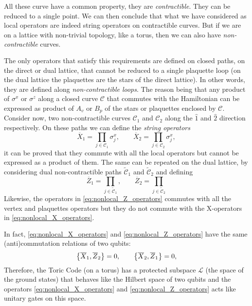 All these curve have a common property, they are \emph{contractible}.
They can be reduced to a single point.
We can then conclude that what we have considered as local operators are indeed string operators on contractible curves.
But if we are on a lattice with non-trivial topology, like a torus, then we can also have \emph{non-contractible} curves.





The only operators that satisfy this requirements are defined on closed paths, on the direct or dual lattice, that cannot be reduced to a single plaquette loop (on the dual lattice the plaquettes are the stars of the direct lattice).
In other words, they are defined along \emph{non-contractible loops}.
The reason being that any product of $\sigma^x$ or $\sigma^z$ along a closed curve $\mathcal{C}$ that commutes with the Hamiltonian can be expressed as product of $A_v$ or $B_p$ of the stars or plaquettes enclosed by $\mathcal{C}$.
Consider now, two non-contractible curves $\mathcal{C}_{1}$ and $\mathcal{C}_{2}$ along the $\hat{1}$ and $\hat{2}$ direction respectively.
On these paths we can define the \emph{string operators}
\begin{equation}
    \overline{X}_1 = \prod_{j \in \mathcal{C}_1}  \sigma^x_j, \qquad
    \overline{X}_2 = \prod_{j \in \mathcal{C}_2}  \sigma^x_j,
    \label{eq:nonlocal_X_operators}
\end{equation}
it can be proved that they commute with all the local operators but cannot be expressed as a product of them.
The same can be repeated on the dual lattice, by considering dual non-contractible paths $\tilde{\mathcal{C}}_1$ and $\tilde{\mathcal{C}}_2$ and defining
\begin{equation}
    \overline{Z}_1 = \prod_{j \in \mathcal{\tilde{C}}_1}, \qquad
    \overline{Z}_2 = \prod_{j \in \mathcal{\tilde{C}}_2}
    \label{eq:nonlocal_Z_operators}
\end{equation}
Likewise, the operators in \eqref{eq:nonlocal_Z_operators} commutes with all the vertex and plaquettes operators but they do not commute with the X-operators in \eqref{eq:nonlocal_X_operators}.

In fact, \eqref{eq:nonlocal_X_operators} and \eqref{eq:nonlocal_Z_operators} have the same (anti)commutation relations of two qubits:
\begin{equation}
    \qty{ \overline{X}_1, \overline{Z}_2 } = 0, \qquad
    \qty{ \overline{X}_2, \overline{Z}_1 } = 0,
\end{equation}
Therefore, the Toric Code (on a torus) has a protected subspace $\mathcal{L}$ (the space of the ground states) that behaves like the Hilbert space of two qubits and the operators \eqref{eq:nonlocal_X_operators} and \eqref{eq:nonlocal_Z_operators} acts like unitary gates on this space.

